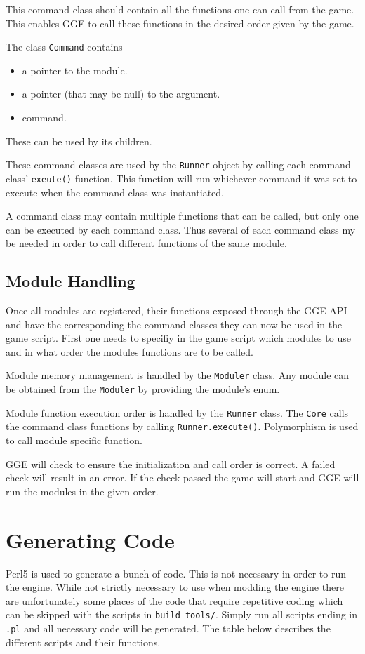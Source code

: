 This command class should contain all the functions one can call from the game. 
This enables GGE to call these functions in the desired order given by the game.

The class \verb|Command| contains
\begin{itemize}
	\item a pointer to the module.
	\item a pointer (that may be null) to the argument.
	\item command.
\end{itemize}
These can be used by its children.

These command classes are used by the \verb|Runner| object by calling each command class' \verb|exeute()| function.
This function will run whichever command it was set to execute when the command class was instantiated.

A command class may contain multiple functions that can be called, but only one can be executed by each command class.
Thus several of each command class my be needed in order to call different functions of the same module.



\subsection{Module Handling}
Once all modules are registered, their functions exposed through the GGE API and have the corresponding 
the command classes they can now be used in the game script. First one needs to specifiy in the game script which modules
to use and in what order the modules functions are to be called. 

Module memory management is handled by the \verb|Moduler| class. Any module can be obtained from the \verb|Moduler| by providing the module's enum.

Module function execution order is handled by the \verb|Runner| class. The \verb|Core| calls the command class functions by calling \verb|Runner.execute()|. Polymorphism is used to call module specific function.

GGE will check to ensure the initialization and call order is correct. 
A failed check will result in an error. 
If the check passed the game will start and GGE will run the modules in the given order.



\section{Generating Code} \label{generating code}
Perl5 is used to generate a bunch of code. This is not necessary in order to run the engine. 
While not strictly necessary to use when modding the engine there are unfortunately some places of the code that
require repetitive coding which can be skipped with the scripts in \verb|build_tools/|.
Simply run all scripts ending in \verb|.pl| and all necessary code will be generated. 
The table below describes the different scripts and their functions.

